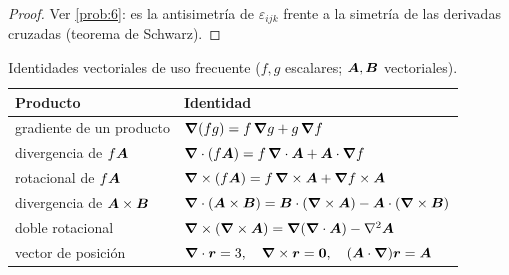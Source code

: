 \begin{proof}
Ver \cref{prob:6}: es la antisimetría de $\varepsilon_{ijk}$ frente a la
simetría de las derivadas cruzadas (teorema de Schwarz).
\end{proof}

\begin{table}[ht]
\centering
\caption{Identidades vectoriales de uso frecuente ($f,g$ escalares; $\bm{A},\bm{B}$ vectoriales).}
\label{tab:identidades}
\small
\begin{tabular}{@{}l l@{}}
\toprule
\color{cian}Producto & \color{cian}Identidad\\
\midrule
gradiente de un producto & $\bm{\nabla}(fg)=f\,\bm{\nabla} g+g\,\bm{\nabla} f$\\
divergencia de $f\bm{A}$ & $\bm{\nabla}\cdot(f\bm{A})=f\,\bm{\nabla}\cdot\bm{A}+\bm{A}\cdot\bm{\nabla} f$\\
rotacional de $f\bm{A}$ & $\bm{\nabla}\times(f\bm{A})=f\,\bm{\nabla}\times\bm{A}+\bm{\nabla} f\times\bm{A}$\\
divergencia de $\bm{A}\times\bm{B}$ & $\bm{\nabla}\cdot(\bm{A}\times\bm{B})=\bm{B}\cdot(\bm{\nabla}\times\bm{A})-\bm{A}\cdot(\bm{\nabla}\times\bm{B})$\\
doble rotacional & $\bm{\nabla}\times(\bm{\nabla}\times\bm{A})=\bm{\nabla}(\bm{\nabla}\cdot\bm{A})-\nabla^{2}\bm{A}$\\
vector de posición & $\bm{\nabla}\cdot\bm{r}=3,\quad \bm{\nabla}\times\bm{r}=\bm{0},\quad (\bm{A}\cdot\bm{\nabla})\bm{r}=\bm{A}$\\
\bottomrule
\end{tabular}
\end{table}
